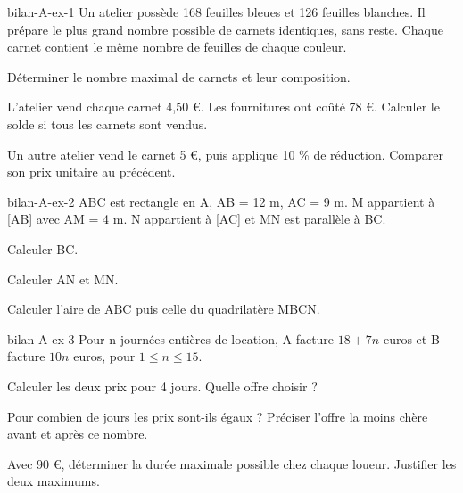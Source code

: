 \begin{blocEdition}{bilan-A-ex-1}
Un atelier possède 168 feuilles bleues et 126 feuilles blanches. Il prépare le plus grand nombre possible de carnets identiques, sans reste. Chaque carnet contient le même nombre de feuilles de chaque couleur.\begin{questions}
\item Déterminer le nombre maximal de carnets et leur composition.
\item L’atelier vend chaque carnet 4,50 €. Les fournitures ont coûté 78 €. Calculer le solde si tous les carnets sont vendus.
\item Un autre atelier vend le carnet 5 €, puis applique 10 \% de réduction. Comparer son prix unitaire au précédent.
\end{questions}\par{}
\end{blocEdition}
\begin{blocEdition}{bilan-A-ex-2}
ABC est rectangle en A, AB = 12 m, AC = 9 m. M appartient à [AB] avec AM = 4 m. N appartient à [AC] et MN est parallèle à BC.\begin{questions}
\item Calculer BC.
\item Calculer AN et MN.
\item Calculer l’aire de ABC puis celle du quadrilatère MBCN.
\end{questions}\par{}\label{fig-bilan-A-ex-2}

\end{blocEdition}
\begin{blocEdition}{bilan-A-ex-3}
Pour n journées entières de location, A facture $18+7n$ euros et B facture $10n$ euros, pour $1\le n\le15$.\begin{questions}
\item Calculer les deux prix pour 4 jours. Quelle offre choisir ?
\item Pour combien de jours les prix sont-ils égaux ? Préciser l’offre la moins chère avant et après ce nombre.
\item Avec 90 €, déterminer la durée maximale possible chez chaque loueur. Justifier les deux maximums.
\end{questions}\par{}\label{fig-bilan-A-ex-3}

\end{blocEdition}
